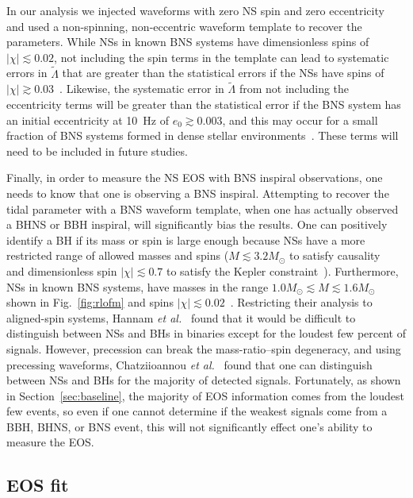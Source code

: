 \documentclass[twocolumn,prd,amssymb,aps,nofootinbib,showpacs,epsf]{revtex4}
\begin{document}
In our analysis we injected waveforms with zero NS spin and zero eccentricity and used a non-spinning, non-eccentric waveform template to recover the parameters. While NSs in known BNS systems have dimensionless spins of $|\chi| \lesssim 0.02$, not including the spin terms in the template can lead to systematic errors in $\tilde\Lambda$ that are greater than the statistical errors if the NSs have spins of $|\chi| \gtrsim 0.03$~\cite{Favata2014}. Likewise, the systematic error in $\tilde\Lambda$ from not including the eccentricity terms will be greater than the statistical error if the BNS system has an initial eccentricity at 10~Hz of $e_0 \gtrsim 0.003$, and this may occur for a small fraction of BNS systems formed in dense stellar environments~\cite{Favata2014}. These terms will need to be included in future studies.

Finally, in order to measure the NS EOS with BNS inspiral observations, one needs to know that one is observing a BNS inspiral. Attempting to recover the tidal parameter with a BNS waveform template, when one has actually observed a BHNS or BBH inspiral, will significantly bias the results. One can positively identify a BH if its mass or spin is large enough because NSs have a more restricted range of allowed masses and spins ($M \lesssim 3.2M_\odot$ to satisfy causality~\cite{RhoadesRuffini1974} and dimensionless spin $| \chi | \lesssim 0.7$ to satisfy the Kepler constraint~\cite{CookShapiroTeukolsky1994}). Furthermore, NSs in known BNS systems, have masses in the range $1.0M_\odot \lesssim M \lesssim 1.6M_\odot$ shown in Fig.~\ref{fig:rlofm} and spins $|\chi| \lesssim 0.02$~\cite{Favata2014}.  Restricting their analysis to aligned-spin systems, Hannam {\it et al.}~\cite{HannamBrownFairhurst2013} found that it would be difficult to distinguish between NSs and BHs in binaries except for the loudest few percent of signals. However, precession can break the mass-ratio--spin degeneracy, and using precessing waveforms, Chatziioannou {\it et al.}~\cite{ChatziioannouCornishKlein2014} found that one can distinguish between NSs and BHs for the majority of detected signals. Fortunately, as shown in Section~\ref{sec:baseline}, the majority of EOS information comes from the loudest few events, so even if one cannot determine if the weakest signals come from a BBH, BHNS, or BNS event, this will not significantly effect one's ability to measure the EOS.

\subsection{EOS fit}
\label{sec:systematicEOS}
\end{document}

